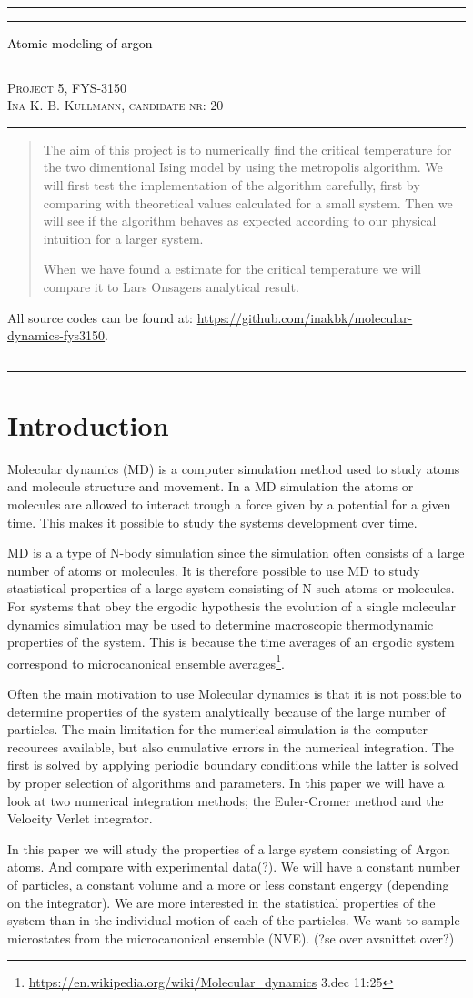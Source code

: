 \documentclass[11pt,a4wide]{article}
\newcommand*{\titleAT}{\begingroup %
\newlength{\drop} %
\drop=0.1\textheight %

\rule{\textwidth}{1pt}\par %
\vspace{2pt}\vspace{-\baselineskip} %
\rule{\textwidth}{0.4pt}\par %

\vspace{0.5\drop} %
\centering %
\textcolor{black}{ %
{\Huge Atomic modeling of argon}\\[0.75\baselineskip] %
} 

\vspace{0.25\drop} %
\rule{0.3\textwidth}{0.4pt}\par %
\vspace{0.25\drop} %

{\Large \textsc{Project 5, FYS-3150\\[0.75\baselineskip] \normalsize{Ina K. B. Kullmann, candidate nr: 20}
}}\par %


\vspace{0.25\drop} %
\rule{0.3\textwidth}{0.4pt}\par %
\vspace{0.25\drop} %

\begin{abstract}
The aim of this project is to numerically find the critical temperature for the two dimentional Ising model by using the metropolis algorithm. We will first test the implementation of the algorithm carefully, first by comparing with theoretical values calculated for a small system. Then we will see if the algorithm behaves as expected according to our physical intuition for a larger system.

When we have found a estimate for the critical temperature we will compare it to Lars Onsagers analytical result.

\end{abstract}
\vspace*{0.25\drop} %

\begin{center}
{ \scriptsize \noindent All source codes can be found at: \url{https://github.com/inakbk/molecular-dynamics-fys3150}. }
\end{center}

\rule{\textwidth}{0.4pt}\par %
\vspace{2pt}\vspace{-\baselineskip} %
\rule{\textwidth}{1pt}\par %

\endgroup}
\begin{document}
\titleAT %


\newpage
\tableofcontents
\newpage

\section{Introduction}

Molecular dynamics (MD) is a computer simulation method used to study atoms and molecule structure and movement. In a MD simulation the atoms or molecules are allowed to interact trough a force given by a potential for a given time. This makes it possible to study the systems development over time. 

MD is a a type of N-body simulation since the simulation often consists of a large number of atoms or molecules. It is therefore possible to use MD to study stastistical properties of a large system consisting of N such atoms or molecules. For systems that obey the ergodic hypothesis the evolution of a single molecular dynamics simulation may be used to determine macroscopic thermodynamic properties of the system. This is because the time averages of an ergodic system correspond to microcanonical ensemble averages\footnote{\url{https://en.wikipedia.org/wiki/Molecular\_dynamics} 3.dec 11:25}.

Often the main motivation to use Molecular dynamics is that it is not possible to determine properties of the system analytically because of the large number of particles. The main limitation for the numerical simulation is the computer recources available, but also cumulative errors in the numerical integration. The first is solved by applying periodic boundary conditions while the latter is solved by proper selection of algorithms and parameters. In this paper we will have a look at two numerical integration methods; the Euler-Cromer method and the Velocity Verlet integrator. 


In this paper we will study the properties of a large system consisting of Argon atoms. And compare with experimental data(?). We will have a constant number of particles, a constant volume and a more or less constant engergy (depending on the integrator). We are more interested in the statistical properties of the system than in the individual motion of each of the particles. We want to sample microstates from the microcanonical ensemble (NVE).
(?se over avsnittet over?)
\end{document}
